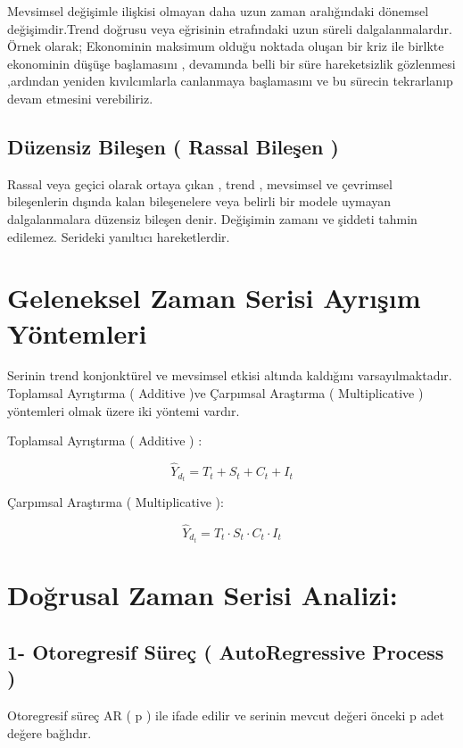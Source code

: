 \documentclass[11pt]{article}
\begin{document}
Mevsimsel değişimle ilişkisi olmayan daha uzun zaman aralığındaki
dönemsel değişimdir.Trend doğrusu veya eğrisinin etrafındaki uzun süreli
dalgalanmalardır. Örnek olarak; Ekonominin maksimum olduğu noktada
oluşan bir kriz ile birlkte ekonominin düşüşe başlamasını , devamında
belli bir süre hareketsizlik gözlenmesi ,ardından yeniden kıvılcımlarla
canlanmaya başlamasını ve bu sürecin tekrarlanıp devam etmesini
verebiliriz.

\subsection{Düzensiz Bileşen ( Rassal Bileşen
)}\label{duxfczensiz-bileux15fen-rassal-bileux15fen}

Rassal veya geçici olarak ortaya çıkan , trend , mevsimsel ve çevrimsel
bileşenlerin dışında kalan bileşenelere veya belirli bir modele uymayan
dalgalanmalara düzensiz bileşen denir. Değişimin zamanı ve şiddeti
tahmin edilemez. Serideki yanıltıcı hareketlerdir.

\section{Geleneksel Zaman Serisi Ayrışım
Yöntemleri}\label{geleneksel-zaman-serisi-ayrux131ux15fux131m-yuxf6ntemleri}

Serinin trend konjonktürel ve mevsimsel etkisi altında kaldığını
varsayılmaktadır. Toplamsal Ayrıştırma ( Additive )ve Çarpımsal
Araştırma ( Multiplicative ) yöntemleri olmak üzere iki yöntemi vardır.

Toplamsal Ayrıştırma ( Additive ) :

\[ \hat Y_{d_t} = T_{t}+ S_{t}+ C_{t}+ I_{t} \]

Çarpımsal Araştırma ( Multiplicative ):

\[ \hat Y_{d_t} = T_{t}\cdot S_{t}\cdot C_{t}\cdot I_{t} \]

    \section{Doğrusal Zaman Serisi
Analizi:}\label{doux11frusal-zaman-serisi-analizi}

\subsection{1- Otoregresif Süreç ( AutoRegressive Process
)}\label{otoregresif-suxfcreuxe7-autoregressive-process}

Otoregresif süreç AR ( p ) ile ifade edilir ve serinin mevcut değeri
önceki p adet değere bağlıdır.
\end{document}
